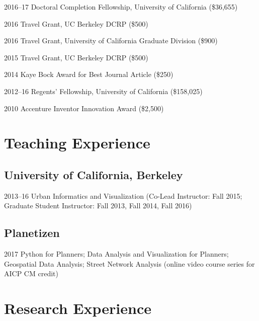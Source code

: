 \documentclass{academiccv}
\begin{document}
\begin{tablist}
	\item[2016--17] \tab Doctoral Completion Fellowship, University of California (\$36,655)
	\item[2016]     \tab Travel Grant, UC Berkeley DCRP (\$500)
	\item[2016]     \tab Travel Grant, University of California Graduate Division (\$900)
	\item[2015]     \tab Travel Grant, UC Berkeley DCRP (\$500)
	\item[2014]     \tab Kaye Bock Award for Best Journal Article (\$250)
	\item[2012--16] \tab Regents' Fellowship, University of California (\$158,025)
	\item[2010]     \tab Accenture Inventor Innovation Award (\$2,500)
\end{tablist}



\section*{Teaching Experience}

\subsection*{University of California, Berkeley}

\begin{tablist}
\item[2013--16]	\tab Urban Informatics and Visualization (Co-Lead Instructor: Fall 2015; Graduate Student Instructor: Fall 2013, Fall 2014, Fall 2016)
\end{tablist}

\subsection*{Planetizen}

\begin{tablist}
\item[2017]		\tab Python for Planners; Data Analysis and Visualization for Planners; Geospatial Data Analysis; Street Network Analysis (online video course series for AICP CM credit)
\end{tablist}



\section*{Research Experience}
\end{document}
